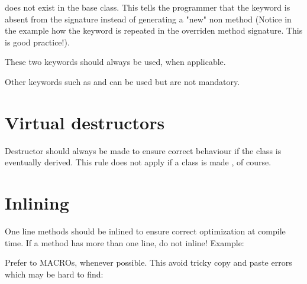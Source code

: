 \begin{center}
\end{center}
does not exist in the base class. This tells the programmer that the 
 keyword is absent from the signature instead of generating a "new" 
non   method (Notice in the example how the keyword 
 is repeated in the overriden method signature. This is good 
practice!).

These two keywords should always be used, when applicable.

Other keywords such as  and  can be used but are not 
mandatory.

\section{Virtual destructors}
Destructor should always be made  to ensure correct behaviour if 
the class is eventually derived. This rule does not apply if a class is made 
, of course.

\section{Inlining}
One line methods should be inlined to ensure correct optimization at compile 
time. If a method has more than one line, do not inline! Example:

Prefer  to MACROs, whenever possible. This avoid tricky copy and 
paste errors which may be hard to find:
